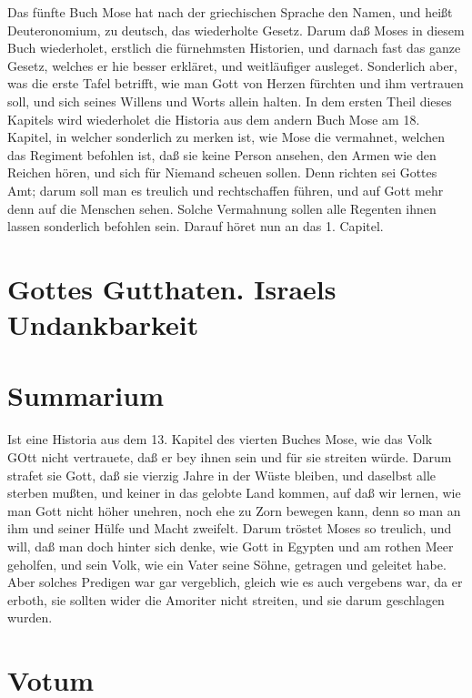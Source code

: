 Das fünfte Buch Mose hat nach der griechischen Sprache den Namen, und heißt Deuteronomium, zu deutsch, das wiederholte Gesetz. Darum daß Moses in diesem Buch wiederholet, erstlich die fürnehmsten Historien, und darnach fast das ganze Gesetz, welches er hie besser erkläret, und weitläufiger ausleget. Sonderlich aber, was die erste Tafel betrifft, wie man Gott von Herzen fürchten und ihm vertrauen soll, und sich seines Willens und Worts allein halten. In dem ersten Theil dieses Kapitels wird wiederholet die Historia aus dem andern Buch Mose am 18. Kapitel, in welcher sonderlich zu
merken ist, wie Mose die vermahnet, welchen das Regiment befohlen ist, daß sie keine Person ansehen, den Armen wie den Reichen hören, und sich für Niemand scheuen sollen. Denn richten sei Gottes Amt; darum soll man es treulich und rechtschaffen führen, und auf Gott mehr denn auf die Menschen sehen. Solche Vermahnung sollen alle Regenten ihnen lassen sonderlich befohlen sein. Darauf höret nun an das 1. Capitel.

\section{Gottes Gutthaten. Israels Undankbarkeit}

\section{Summarium}

Ist eine Historia aus dem 13. Kapitel des vierten Buches Mose, wie das Volk GOtt nicht vertrauete, daß er bey ihnen sein und für sie streiten würde. Darum strafet sie Gott, daß sie vierzig Jahre in der Wüste bleiben, und daselbst alle sterben mußten, und keiner in das gelobte Land kommen, auf daß wir lernen, wie man Gott nicht höher unehren, noch ehe zu Zorn bewegen kann, denn so man an ihm und seiner Hülfe und Macht zweifelt. Darum tröstet Moses so treulich, und will, daß man doch hinter sich denke, wie Gott in Egypten und am rothen Meer geholfen, und sein Volk, wie ein Vater seine Söhne, getragen und geleitet habe. Aber solches Predigen war gar vergeblich, gleich wie es auch vergebens war, da er erboth, sie sollten wider die Amoriter nicht streiten, und sie darum geschlagen wurden.

\section{Votum}

